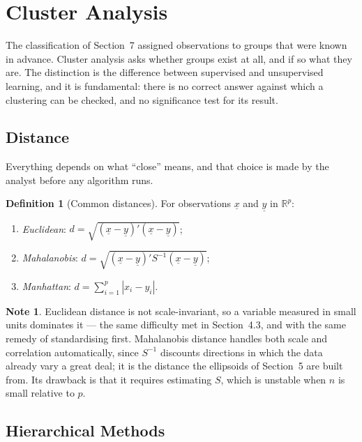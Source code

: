 \documentclass[11pt,a4paper]{article}
\theoremstyle{definition}
\newtheorem{defn}[thm]{Definition}
\newtheorem{note}[thm]{Note}
\begin{document}
\section{Cluster Analysis}

The classification of Section~7 assigned observations to groups that were known
in advance. Cluster analysis asks whether groups exist at all, and if so what
they are. The distinction is the difference between supervised and unsupervised
learning, and it is fundamental: there is no correct answer against which a
clustering can be checked, and no significance test for its result.

\subsection{Distance}

Everything depends on what ``close'' means, and that choice is made by the
analyst before any algorithm runs.

\begin{defn}[Common distances]
For observations $\underline{x}$ and $\underline{y}$ in $\mathbb{R}^{p}$:
\begin{enumerate}
\item[(i)] \emph{Euclidean}:
$d = \sqrt{\left(\underline{x}-\underline{y}\right)'\left(\underline{x}-\underline{y}\right)}$;
\item[(ii)] \emph{Mahalanobis}:
$d = \sqrt{\left(\underline{x}-\underline{y}\right)'S^{-1}\left(\underline{x}-\underline{y}\right)}$;
\item[(iii)] \emph{Manhattan}: $d = \sum^{p}_{i=1}\left|x_i-y_i\right|$.
\end{enumerate}
\end{defn}

\begin{note}
Euclidean distance is not scale-invariant, so a variable measured in small units
dominates it --- the same difficulty met in Section~4.3, and with the same
remedy of standardising first. Mahalanobis distance handles both scale and
correlation automatically, since $S^{-1}$ discounts directions in which the data
already vary a great deal; it is the distance the ellipsoids of Section~5 are
built from. Its drawback is that it requires estimating $S$, which is unstable
when $n$ is small relative to $p$.
\end{note}

\subsection{Hierarchical Methods}
\end{document}
